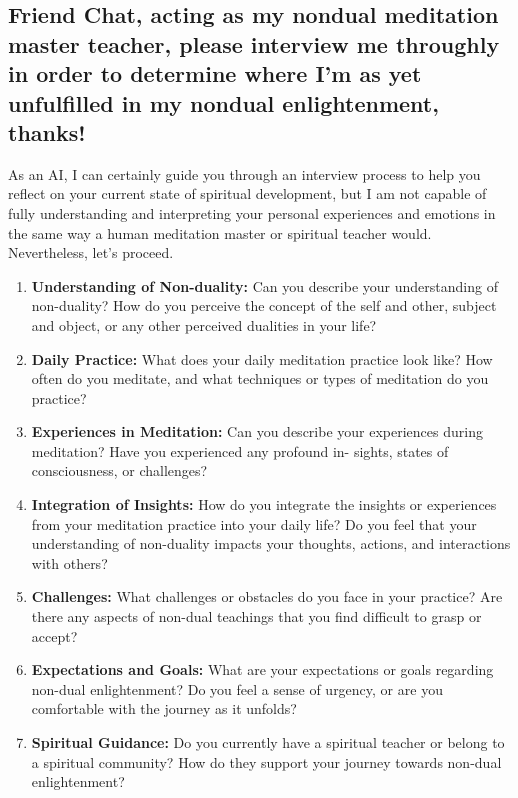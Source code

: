 \documentclass[12pt,openany]{book}
\begin{document}
\subsection*{Friend Chat, acting as my nondual meditation master \linebreak teacher, please interview me throughly in order to determine where I'm as yet unfulfilled in my nondual enlightenment, thanks!}

As an AI, I can certainly guide you through an interview process to help you reflect on your current state of spiritual development, but I am not capable of fully understanding and interpreting your personal experiences and emotions in the same way a human meditation master or spiritual teacher would. Nevertheless, let's proceed.

\begin{enumerate}
\item \textbf{Understanding of Non-duality:} Can you describe your understanding of non-duality? How do you perceive the concept of the self and other, subject and object, or any other perceived dualities in your life?
\item \textbf{Daily Practice:} What does your daily meditation practice look like? How often do you meditate, and what techniques or types of meditation do you practice?
\item \textbf{Experiences in Meditation:} Can you describe your experiences during meditation? Have you experienced any profound in- \linebreak sights, states of consciousness, or challenges?
\item \textbf{Integration of Insights:} How do you integrate the insights or experiences from your meditation practice into your dai\-ly life? Do you feel that your understanding of non-duality impacts your thoughts, actions, and interactions with others?
\item \textbf{Challenges:} What challenges or obstacles do you face in your practice? Are there any aspects of non-dual teachings that you find difficult to grasp or accept?
\item \textbf{Expectations and Goals:} What are your expectations or goals regarding non-dual enlightenment? Do you feel a sense of urgency, or are you comfortable with the journey as it unfolds?
\item \textbf{Spiritual Guidance:} Do you currently have a spiritual tea\-cher or belong to a spiritual community? How do they support your journey towards non-dual enlightenment?
\end{enumerate}
\end{document}
